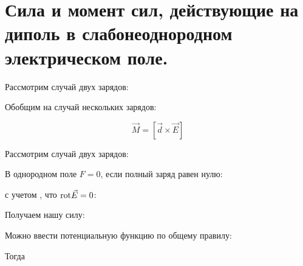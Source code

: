 \section{Сила и момент сил, действующие на диполь в слабонеоднородном
электрическом поле.}


Рассмотрим случай двух зарядов:





Обобщим на случай нескольких зарядов:



\[\boxed{\vec{M}=[\vec{d} \times \vec{E}]}\]

\newpage


Рассмотрим случай двух зарядов:


В однородном поле $F=0$, если полный заряд равен нулю:


с учетом , что $\mathrm{rot}\vec{E}=0$:


Получаем нашу силу:


Можно ввести потенциальную функцию по общему правилу:


Тогда 


\newpage

